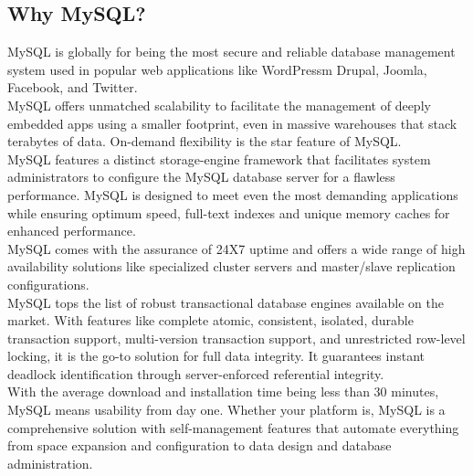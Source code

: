 \documentclass[a4paper,12pt]{article}
\begin{document}
\subsection*{Why MySQL?}
MySQL is globally for being the most secure and reliable database management system used in popular web applications like WordPressm Drupal, Joomla, Facebook, and Twitter.\\
MySQL offers unmatched scalability to facilitate the management of deeply embedded apps using a smaller footprint, even in massive warehouses that stack terabytes of data. On-demand flexibility is the star feature of MySQL.\\
MySQL features a distinct storage-engine framework that facilitates system administrators to configure the MySQL database server for a flawless performance. MySQL is designed to meet even the most demanding applications while ensuring optimum speed, full-text indexes and unique memory caches for enhanced performance.\\
MySQL comes with the assurance of 24X7 uptime and offers a wide range of high availability solutions like specialized cluster servers and master/slave replication configurations.\\
MySQL tops the list of robust transactional database engines available on the market. With features like complete atomic, consistent, isolated, durable transaction support, multi-version transaction support, and unrestricted row-level locking, it is the go-to solution for full data integrity. It guarantees instant deadlock identification through server-enforced referential integrity.\\
With the average download and installation time being less than 30 minutes, MySQL means usability from day one. Whether your platform is, MySQL is a comprehensive solution with self-management features that automate everything from space expansion and configuration to data design and database administration.
\end{document}
